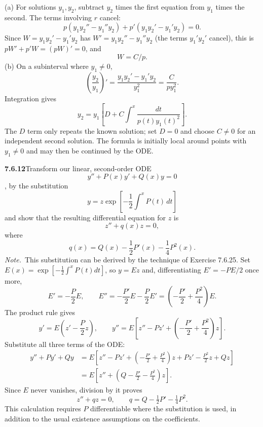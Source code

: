 (a) For solutions $y_1,y_2$, subtract $y_2$ times the first equation
from $y_1$ times the second. The terms involving $r$ cancel:
\[
p(y_1y_2''-y_1''y_2)+p'(y_1y_2'-y_1'y_2)=0.
\]
Since $W=y_1y_2'-y_1'y_2$ has $W'=y_1y_2''-y_1''y_2$ (the terms
$y_1'y_2'$ cancel), this is $pW'+p'W=(pW)'=0$, and
\[
\boxed{W=C/p}.
\]
(b) On a subinterval where $y_1\ne0$,
\[
\left(\frac{y_2}{y_1}\right)'
=\frac{y_1y_2'-y_1'y_2}{y_1^2}=\frac{C}{p y_1^2}.
\]
Integration gives
\[
\boxed{y_2=y_1\left[D+C\int^x\frac{dt}{p(t)y_1(t)^2}\right]}.
\]
The $D$ term only repeats the known solution; set $D=0$ and choose
$C\ne0$ for an independent second solution. The formula is initially
local around points with $y_1\ne0$ and may then be continued by the ODE.

\par\bigskip
\noindent\textbf{7.6.12}\quad Transform our linear, second-order ODE
\[
y''+P(x)y'+Q(x)y=0
\]
, by the substitution
\[
y=z\exp\left[-\frac{1}{2}\int^{x}P(t)\,dt\right]
\]
and show that the resulting differential equation for $z$ is
\[
z''+q(x)z=0,
\]
where
\[
q(x)=Q(x)-\frac{1}{2}P'(x)-\frac{1}{4}P^{2}(x).
\]
\emph{Note.}~This substitution can be derived by the technique of
Exercise 7.6.25.
\solution
Set $E(x)=\exp[-\tfrac12\int^xP(t)dt]$, so $y=Ez$ and, differentiating
$E'=-PE/2$ once more,
\[
E'=-\frac P2E,\qquad E''=-\frac{P'}2E-\frac P2E'
=\left(-\frac{P'}2+\frac{P^2}4\right)E.
\]
The product rule gives
\[
y'=E\left(z'-\frac P2z\right),\qquad
y''=E\left[z''-Pz'+\left(-\frac{P'}2+\frac{P^2}4\right)z\right].
\]
Substitute all three terms of the ODE:
\begin{align*}
y''+Py'+Qy
&=E\left[z''-Pz'+\left(-\frac{P'}2+\frac{P^2}4\right)z
 +Pz'-\frac{P^2}2z+Qz\right]\\
&=E\left[z''+\left(Q-\frac{P'}2-\frac{P^2}4\right)z\right].
\end{align*}
Since $E$ never vanishes, division by it proves
\[
\boxed{z''+qz=0,\qquad q=Q-\tfrac12P'-\tfrac14P^2}.
\]
This calculation requires $P$ differentiable where the substitution is
used, in addition to the usual existence assumptions on the coefficients.

